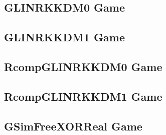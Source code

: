 \documentclass[a3paper]{article}
\theoremstyle{definition}
\begin{document}
\subsection{GLINRKKDM0 Game}
\label{section:game:GLINRKKDM0}
\begin{center}

\end{center}
\begin{pchstack}

\pchspace
\end{pchstack}
\clearpage
\subsection{GLINRKKDM1 Game}
\label{section:game:GLINRKKDM1}
\begin{center}

\end{center}
\begin{pchstack}

\pchspace
\end{pchstack}
\clearpage
\subsection{RcompGLINRKKDM0 Game}
\label{section:game:RcompGLINRKKDM0}
\begin{center}

\end{center}
\begin{pchstack}

\pchspace

\pchspace
\end{pchstack}
\clearpage
\subsection{RcompGLINRKKDM1 Game}
\label{section:game:RcompGLINRKKDM1}
\begin{center}

\end{center}
\begin{pchstack}

\pchspace

\pchspace
\end{pchstack}
\clearpage
\subsection{GSimFreeXORReal Game}
\label{section:game:GSimFreeXORReal}
\begin{center}

\end{center}
\begin{pchstack}

\pchspace
\end{pchstack}
\clearpage
\end{document}
